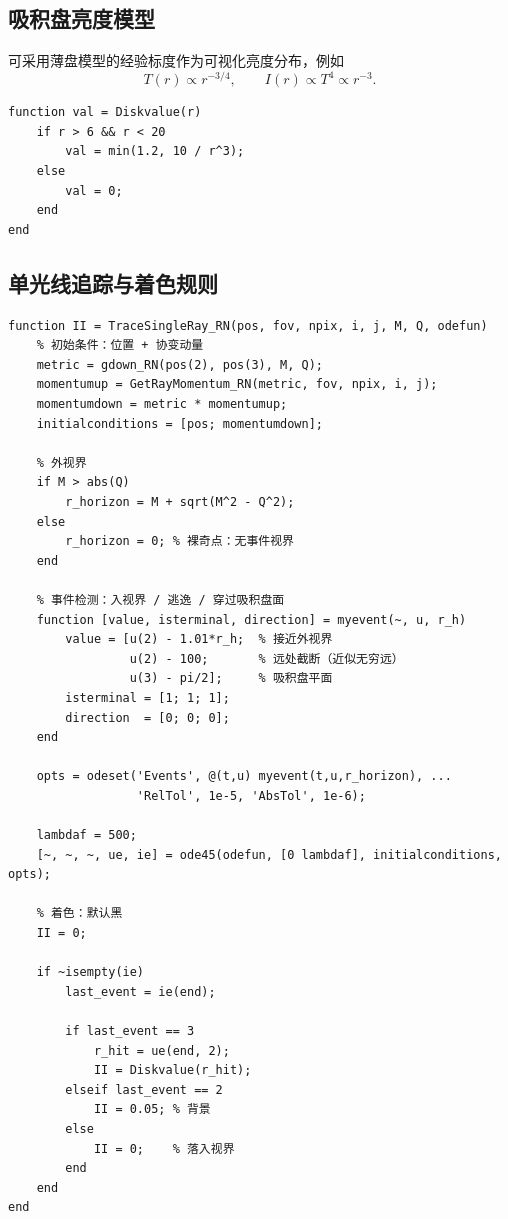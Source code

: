 \documentclass[a4paper,12pt]{article}
\begin{document}
\subsection{吸积盘亮度模型}

可采用薄盘模型的经验标度作为可视化亮度分布，例如
\begin{equation}
T(r)\propto r^{-3/4},\qquad I(r)\propto T^4\propto r^{-3}.
\end{equation}

\begin{lstlisting}[caption={吸积盘亮度函数 \texttt{Diskvalue}}]
function val = Diskvalue(r)
    if r > 6 && r < 20
        val = min(1.2, 10 / r^3);
    else
        val = 0;
    end
end
\end{lstlisting}

\subsection{单光线追踪与着色规则}

\begin{lstlisting}[caption={单光线追踪 \texttt{TraceSingleRay\_RN}}]
function II = TraceSingleRay_RN(pos, fov, npix, i, j, M, Q, odefun)
    % 初始条件：位置 + 协变动量
    metric = gdown_RN(pos(2), pos(3), M, Q);
    momentumup = GetRayMomentum_RN(metric, fov, npix, i, j);
    momentumdown = metric * momentumup;
    initialconditions = [pos; momentumdown];

    % 外视界
    if M > abs(Q)
        r_horizon = M + sqrt(M^2 - Q^2);
    else
        r_horizon = 0; % 裸奇点：无事件视界
    end

    % 事件检测：入视界 / 逃逸 / 穿过吸积盘面
    function [value, isterminal, direction] = myevent(~, u, r_h)
        value = [u(2) - 1.01*r_h;  % 接近外视界
                 u(2) - 100;       % 远处截断（近似无穷远）
                 u(3) - pi/2];     % 吸积盘平面
        isterminal = [1; 1; 1];
        direction  = [0; 0; 0];
    end

    opts = odeset('Events', @(t,u) myevent(t,u,r_horizon), ...
                  'RelTol', 1e-5, 'AbsTol', 1e-6);

    lambdaf = 500;
    [~, ~, ~, ue, ie] = ode45(odefun, [0 lambdaf], initialconditions, opts);

    % 着色：默认黑
    II = 0;

    if ~isempty(ie)
        last_event = ie(end);

        if last_event == 3
            r_hit = ue(end, 2);
            II = Diskvalue(r_hit);
        elseif last_event == 2
            II = 0.05; % 背景
        else
            II = 0;    % 落入视界
        end
    end
end
\end{lstlisting}
\end{document}
